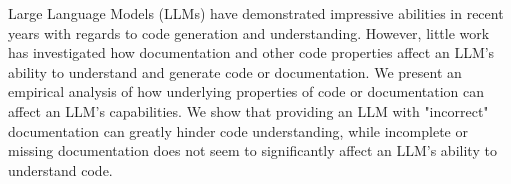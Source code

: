 Large Language Models (LLMs) have demonstrated impressive abilities in recent years with regards to code generation and understanding. However, little work has investigated how documentation and other code properties affect an LLM's ability to understand and generate code or documentation. We present an empirical analysis of how underlying properties of code or documentation can affect an LLM's capabilities.  We show that providing an LLM with "incorrect" documentation can greatly hinder code understanding, while incomplete or missing documentation does not seem to significantly affect an LLM's ability to understand code.